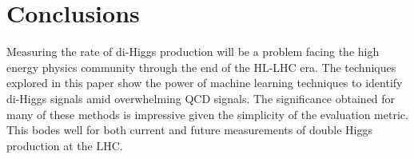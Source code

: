\section{Conclusions}
\label{sec:conclusions}
Measuring the rate of di-Higgs production will be a problem facing the high energy physics community through the end of the HL-LHC era. The techniques explored in this paper show the power of machine learning techniques to identify di-Higgs signals amid overwhelming QCD signals. The significance obtained for many of these methods is impressive given the simplicity of the evaluation metric. This bodes well for both current and future measurements of double Higgs production at the LHC.


